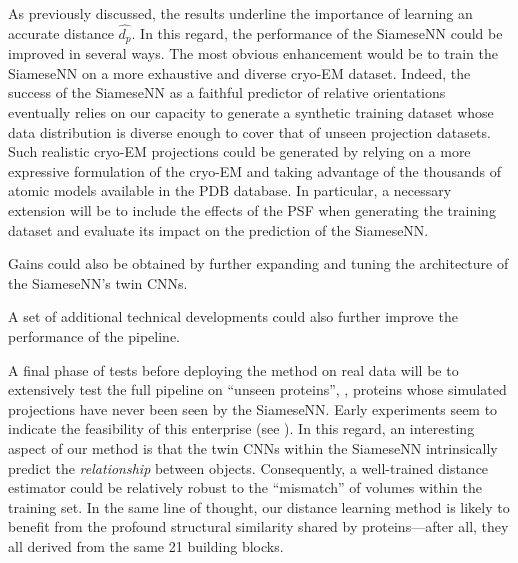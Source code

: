 As previously discussed, the results underline the importance of learning an accurate distance $\widehat{d_p}$.
In this regard, the performance of the SiameseNN could be improved in several ways.
The most obvious enhancement would be to train the SiameseNN on a more exhaustive and diverse cryo-EM dataset.
Indeed, the success of the SiameseNN as a faithful predictor of relative orientations eventually relies on our capacity to generate a synthetic training dataset whose data distribution is diverse enough to cover that of unseen projection datasets.
Such realistic cryo-EM projections could be generated by relying on a more expressive formulation of the cryo-EM  and taking advantage of the thousands of atomic models available in the PDB database.
In particular, a necessary extension will be to include the effects of the PSF when generating the training dataset and evaluate its impact on the prediction of the SiameseNN\@.

Gains could also be obtained by further expanding and tuning the architecture of the SiameseNN's twin CNNs.

A set of additional technical developments could also further improve the performance of the pipeline.  

A final phase of tests before deploying the method on real data will be to extensively test the full pipeline on ``unseen proteins'', \ie, proteins whose simulated projections have never been seen by the SiameseNN\@.
Early experiments seem to indicate the feasibility of this enterprise (see ).
In this regard, an interesting aspect of our method is that the twin CNNs within the SiameseNN intrinsically predict the \textit{relationship} between objects.
Consequently, a well-trained distance estimator could be relatively robust to the ``mismatch'' of volumes within the training set.
In the same line of thought, our distance learning method is likely to benefit from the profound structural similarity shared by proteins---after all, they all derived from the same 21 building blocks.

